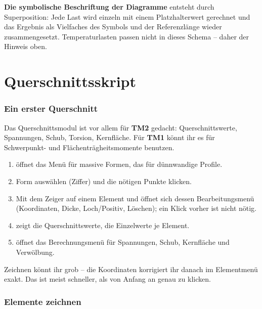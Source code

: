 \textbf{Die symbolische Beschriftung der Diagramme} entsteht durch Superposition: Jede Last wird
einzeln mit einem Platzhalterwert gerechnet und das Ergebnis als Vielfaches des Symbols und der
Referenzlänge wieder zusammengesetzt. Temperaturlasten passen nicht in dieses Schema -- daher der
Hinweis oben.

\part{Querschnittsskript}

\section{Ein erster Querschnitt}

Das Querschnittsmodul ist vor allem für \textbf{TM2} gedacht: Querschnittswerte, Spannungen,
Schub, Torsion, Kernfläche. Für \textbf{TM1} könnt ihr es für Schwerpunkt- und
Flächenträgheitsmomente benutzen.

\begin{enumerate}
  \item {} öffnet das Menü für massive Formen,  das für dünnwandige Profile.
  \item Form auswählen (Ziffer) und die nötigen Punkte klicken.
  \item Mit dem Zeiger auf einem Element und  öffnet sich dessen Bearbeitungsmenü
        (Koordinaten, Dicke, Loch/Positiv, Löschen); ein Klick vorher ist nicht nötig.
  \item {} zeigt die Querschnittswerte,  die Einzelwerte je Element.
  \item {} öffnet das Berechnungsmenü für Spannungen, Schub, Kernfläche und Verwölbung.
\end{enumerate}

Zeichnen könnt ihr grob -- die Koordinaten korrigiert ihr danach im Elementmenü exakt. Das ist
meist schneller, als von Anfang an genau zu klicken.


\section{Elemente zeichnen}

